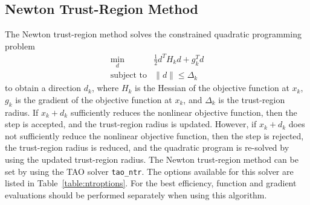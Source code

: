 \documentclass[]{book}
\begin{document}
\subsection{Newton Trust-Region Method}%

The Newton trust-region method solves the constrained quadratic programming
problem
\[
\begin{array}{ll}
\min_d  & \frac{1}{2}d^T H_k d  + g_k^T d \\
\mbox{subject to} & \|d\| \leq \Delta_k
\end{array}
\]
to obtain a direction $d_k$, where $H_k$ is the Hessian of the objective 
function at $x_k$, $g_k$ is the gradient of the objective function at $x_k$, 
and $\Delta_k$ is the trust-region radius.  If $x_k + d_k$ sufficiently 
reduces the nonlinear objective function, then the step is accepted, and the 
trust-region radius is updated.  However, if $x_k + d_k$ does not
sufficiently
reduce the nonlinear objective function, then the step is rejected, the 
trust-region radius is reduced, and the quadratic program is re-solved 
by using the updated trust-region radius. The Newton trust-region method 
can be set by using the TAO solver {\tt tao\_ntr}. The options available 
for this solver are listed in Table~\ref{table:ntroptions}. For the best 
efficiency, 
function and gradient evaluations should be performed separately when 
using this algorithm.
\end{document}
